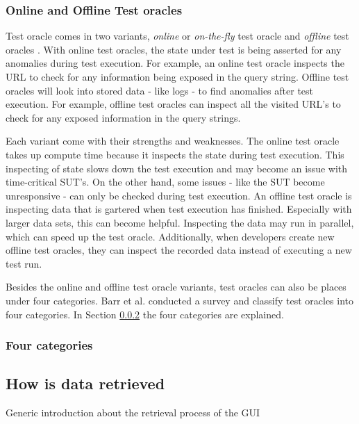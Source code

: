 \subsubsection{Online and Offline Test oracles}
    Test oracle comes in two variants, \emph{online} or \emph{on-the-fly} test oracle and \emph{offline} test oracles \cite{VosAho2021}. With online test oracles, the state under test is being asserted for any anomalies during test execution. For example,  an online test oracle inspects the URL to check for any information being exposed in the query string. Offline test oracles will look into stored data - like logs - to find anomalies after test execution. For example, offline test oracles can inspect all the visited URL's to check for any exposed information in the query strings. 

    Each variant come with their strengths and weaknesses. The online test oracle takes up compute time because it inspects the state during test execution. This inspecting of state slows down the test execution and may become an issue with time-critical SUT's. On the other hand, some issues - like the SUT become unresponsive - can only be checked during test execution. An offline test oracle is inspecting data that is gartered when test execution has finished. Especially with larger data sets, this can become helpful. Inspecting the data may run in parallel, which can speed up the test oracle. Additionally, when developers create new offline test oracles, they can inspect the recorded data instead of executing a new test run.

    Besides the online and offline test oracle variants, test oracles can also be places under four categories. Barr et al. conducted a survey and classify test oracles into four categories. In Section \ref{to:four-cat} the four categories are explained. 

    \subsubsection{Four categories} \label{to:four-cat}
 

\subsection{How is data retrieved}

    Generic introduction about the retrieval process of the GUI

